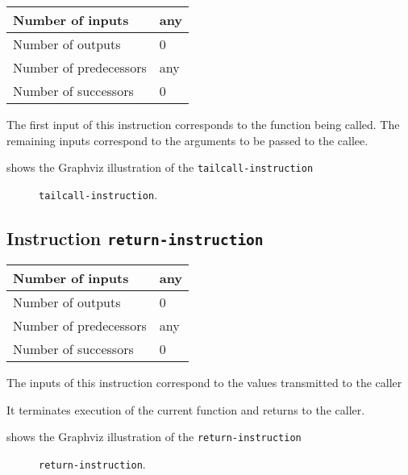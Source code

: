 \begin{tabular}{|l|l|}
\hline
Number of inputs & any\\
\hline
Number of outputs & 0\\
\hline
Number of predecessors & any\\
\hline
Number of successors & 0\\
\hline
\end{tabular}

The first input of this instruction corresponds to the function being
called.  The remaining inputs correspond to the arguments to be passed
to the callee.

 shows the Graphviz illustration of the
\texttt{tailcall-instruction}

\begin{figure}
\begin{center}
\end{center}
\caption{\label{fig-tailcall-instruction}
\texttt{tailcall-instruction}.}
\end{figure}

\subsection{Instruction \texttt{return-instruction}}
\label{mir-instruction-return}

\begin{tabular}{|l|l|}
\hline
Number of inputs & any\\
\hline
Number of outputs & 0\\
\hline
Number of predecessors & any\\
\hline
Number of successors & 0\\
\hline
\end{tabular}

The inputs of this instruction correspond to the values transmitted to
the caller

It terminates execution of the current function and returns to the
caller. 

 shows the Graphviz illustration of the
\texttt{return-instruction}

\begin{figure}
\begin{center}
\end{center}
\caption{\label{fig-return-instruction}
\texttt{return-instruction}.}
\end{figure}

